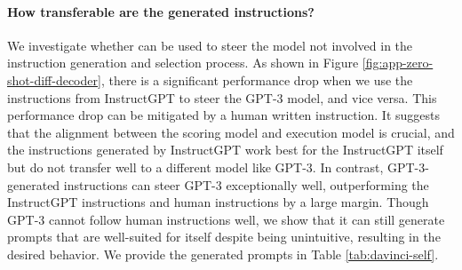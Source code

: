 \paragraph{How transferable are the generated instructions?} We investigate whether \algname can be used to steer the model not involved in the instruction generation and selection process. As shown in Figure \ref{fig:app-zero-shot-diff-decoder}, there is a significant performance drop when we use the instructions from InstructGPT to steer the GPT-3 model, and vice versa. This performance drop can be mitigated by a human written instruction. It suggests that the alignment between the scoring model and execution model is crucial, and the instructions generated by InstructGPT work best for the InstructGPT itself but do not transfer well to a different model like GPT-3. In contrast, GPT-3-generated instructions can steer GPT-3 exceptionally well, outperforming the InstructGPT instructions and human instructions by a large margin. Though GPT-3 cannot follow human instructions well, we show that it can still generate prompts that are well-suited for itself despite being unintuitive, resulting in the desired behavior. We provide the generated prompts in Table \ref{tab:davinci-self}.
